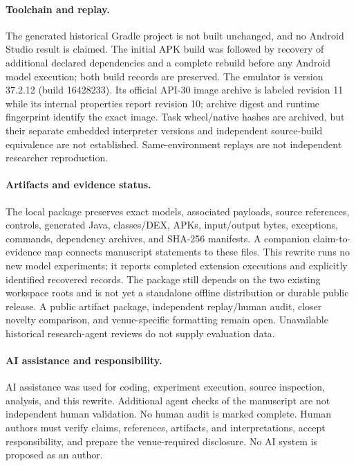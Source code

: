 \documentclass[10pt,twocolumn,letterpaper]{article}
\begin{document}
\paragraph{Toolchain and replay.}
The generated historical Gradle project is not built unchanged, and no Android Studio result is claimed. The initial APK build was followed by recovery of additional declared dependencies and a complete rebuild before any Android model execution; both build records are preserved. The emulator is version 37.2.12 (build 16428233). Its official API-30 image archive is labeled revision 11 while its internal properties report revision 10; archive digest and runtime fingerprint identify the exact image. Task wheel/native hashes are archived, but their separate embedded interpreter versions and independent source-build equivalence are not established. Same-environment replays are not independent researcher reproduction.

\paragraph{Artifacts and evidence status.}
The local package preserves exact models, associated payloads, source references, controls, generated Java, classes/DEX, APKs, input/output bytes, exceptions, commands, dependency archives, and SHA-256 manifests. A companion claim-to-evidence map connects manuscript statements to these files. This rewrite runs no new model experiments; it reports completed extension executions and explicitly identified recovered records. The package still depends on the two existing workspace roots and is not yet a standalone offline distribution or durable public release. A public artifact package, independent replay/human audit, closer novelty comparison, and venue-specific formatting remain open. Unavailable historical research-agent reviews do not supply evaluation data.

\paragraph{AI assistance and responsibility.}
AI assistance was used for coding, experiment execution, source inspection, analysis, and this rewrite. Additional agent checks of the manuscript are not independent human validation. No human audit is marked complete. Human authors must verify claims, references, artifacts, and interpretations, accept responsibility, and prepare the venue-required disclosure. No AI system is proposed as an author.
\end{document}
